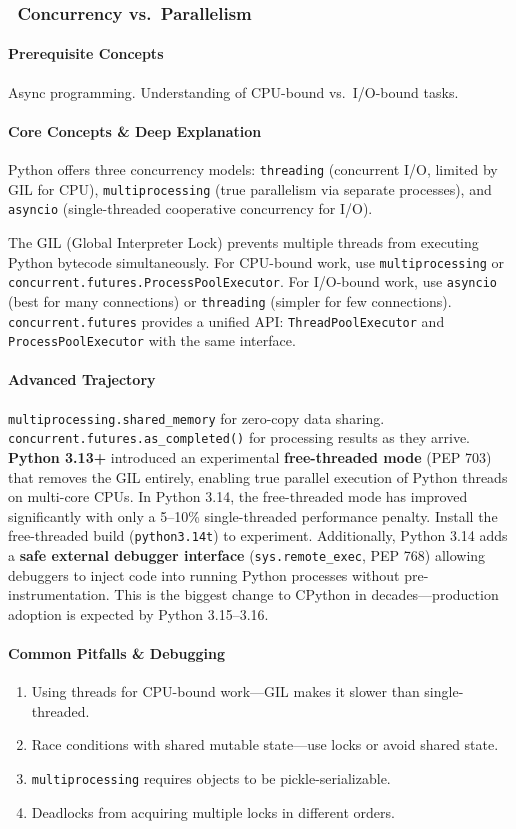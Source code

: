 \documentclass[11pt, a4paper, oneside]{report}
\newcommand{\mustmaster}[1]{\subsubsection{\texorpdfstring{\fcolorbox{blue!40!black}{blue!8}{\footnotesize\bfseries\color{blue!40!black} MUST MASTER}~#1}{#1}}}
\begin{document}
\mustmaster{Concurrency vs.\ Parallelism}

\paragraph{Prerequisite Concepts} Async programming. Understanding of CPU-bound vs.\ I/O-bound tasks.

\paragraph{Core Concepts \& Deep Explanation} Python offers three concurrency models: \texttt{threading} (concurrent I/O, limited by GIL for CPU), \texttt{multiprocessing} (true parallelism via separate processes), and \texttt{asyncio} (single-threaded cooperative concurrency for I/O).

The GIL (Global Interpreter Lock) prevents multiple threads from executing Python bytecode simultaneously. For CPU-bound work, use \texttt{multiprocessing} or \texttt{concurrent.futures.ProcessPoolExecutor}. For I/O-bound work, use \texttt{asyncio} (best for many connections) or \texttt{threading} (simpler for few connections). \texttt{concurrent.futures} provides a unified API: \texttt{ThreadPoolExecutor} and \texttt{ProcessPoolExecutor} with the same interface.

\paragraph{Advanced Trajectory} \texttt{multiprocessing.shared\_memory} for zero-copy data sharing. \texttt{concurrent.futures.as\_completed()} for processing results as they arrive. \textbf{Python 3.13+} introduced an experimental \textbf{free-threaded mode} (PEP 703) that removes the GIL entirely, enabling true parallel execution of Python threads on multi-core CPUs. In Python 3.14, the free-threaded mode has improved significantly with only a 5--10\% single-threaded performance penalty. Install the free-threaded build (\texttt{python3.14t}) to experiment. Additionally, Python 3.14 adds a \textbf{safe external debugger interface} (\texttt{sys.remote\_exec}, PEP 768) allowing debuggers to inject code into running Python processes without pre-instrumentation. This is the biggest change to CPython in decades---production adoption is expected by Python 3.15--3.16.

\paragraph{Common Pitfalls \& Debugging}
\begin{enumerate}[leftmargin=*]
\item Using threads for CPU-bound work---GIL makes it slower than single-threaded.
\item Race conditions with shared mutable state---use locks or avoid shared state.
\item \texttt{multiprocessing} requires objects to be pickle-serializable.
\item Deadlocks from acquiring multiple locks in different orders.
\end{enumerate}
\end{document}
